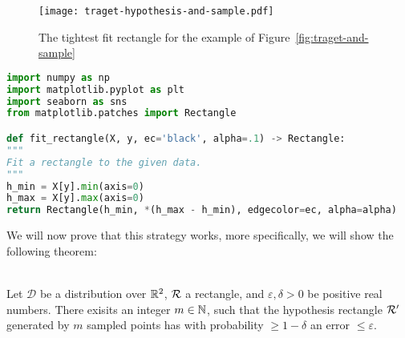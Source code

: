 \begin{figure}
    \begin{center}
        \texttt{[image: traget-hypothesis-and-sample.pdf]}
    \end{center}
    \caption{The tightest fit rectangle for the example of Figure~\ref{fig:traget-and-sample}}
    \label{fig:traget-hypothesis-and-sample}
\end{figure}

\begin{lstlisting}[language=python, caption={A python implementation of the described strategy}, label={lst:python-learning-rectangle}]
import numpy as np
import matplotlib.pyplot as plt
import seaborn as sns
from matplotlib.patches import Rectangle

def fit_rectangle(X, y, ec='black', alpha=.1) -> Rectangle:
"""
Fit a rectangle to the given data.
"""
h_min = X[y].min(axis=0)
h_max = X[y].max(axis=0)
return Rectangle(h_min, *(h_max - h_min), edgecolor=ec, alpha=alpha)
\end{lstlisting}

We will now prove that this strategy works, more specifically, we will show the following theorem:

\begin{theorem}
    \ \\
    Let \(\mathcal{D}\) be a distribution over \(\mathbb{R}^2\), \(\mathcal{R}\) a rectangle, and \(\varepsilon, \delta>0\) be positive real numbers.
    There exisits an integer \(m\in\mathbb{N}\), such that the hypothesis rectangle \(\mathcal{R}^\prime\) generated by \(m\) sampled points has with probability \(\ge 1 - \delta\) an error \(\le\varepsilon\).
\end{theorem}


